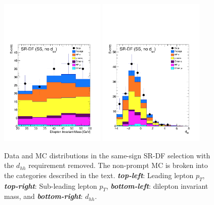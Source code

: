 \begin{figure}[!htb]
\begin{center}
    \includegraphics[width=0.45\textwidth]{figures/search_hh/bkg_estimate/fake/fake_val_sr_df_ss_mll}
    \includegraphics[width=0.45\textwidth]{figures/search_hh/bkg_estimate/fake/fake_val_sr_df_ss_NN_d_hh}
    \caption{
        Data and MC distributions in the same-sign SR-DF selection with the $d_{hh}$ requirement removed.
        The non-prompt MC is broken into the categories described in the text.
        \textbf{\textit{top-left}}: Leading lepton $p_{T}$, \textbf{\textit{top-right}}: Sub-leading lepton $p_{T}$,
        \textbf{\textit{bottom-left}}: dilepton invariant mass, and \textbf{\textit{bottom-right}}: $d_{hh}$.
    }
    \label{fig:fake_val_srdf}
    \end{center}
\end{figure}

